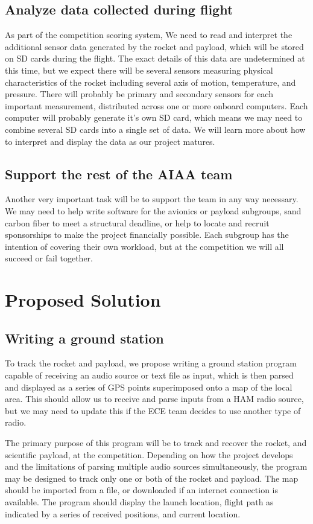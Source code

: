 \documentclass[onecolumn, draftclsnofoot,10pt, compsoc]{IEEEtran}
\begin{document}
\subsection{Analyze data collected during flight}
As part of the competition scoring system, We need to read and interpret the additional sensor data generated by the rocket and payload, which will be stored on SD cards during the flight.  The exact details of this data are undetermined at this time, but we expect there will be several sensors measuring physical characteristics of the rocket including several axis of motion, temperature, and pressure.  There will probably be primary and secondary sensors for each important measurement, distributed across one or more onboard computers.  Each computer will probably generate it's own SD card, which means we may need to combine several SD cards into a single set of data.  We will learn more about how to interpret and display the data as our project matures.

\subsection{Support the rest of the AIAA team}
Another very important task will be to support the team in any way necessary.  We may need to help write software for the avionics or payload subgroups, sand carbon fiber to meet a structural deadline, or help to locate and recruit sponsorships to make the project financially possible.  Each subgroup has the intention of covering their own workload, but at the competition we will all succeed or fail together.

\section{Proposed Solution}

\subsection{Writing a ground station}
To track the rocket and payload, we propose writing a ground station program capable of receiving an audio source or text file as input, which is then parsed and displayed as a series of GPS points superimposed onto a map of the local area.  This should allow us to receive and parse inputs from a HAM radio source, but we may need to update this if the ECE team decides to use another type of radio.

\par
The primary purpose of this program will be to track and recover the rocket, and scientific payload, at the competition.  Depending on how the project develops and the limitations of parsing multiple audio sources simultaneously, the program may be designed to track only one or both of the rocket and payload.  The map should be imported from a file, or downloaded if an internet connection is available.  The program should display the launch location, flight path as indicated by a series of received positions, and current location.
\end{document}
